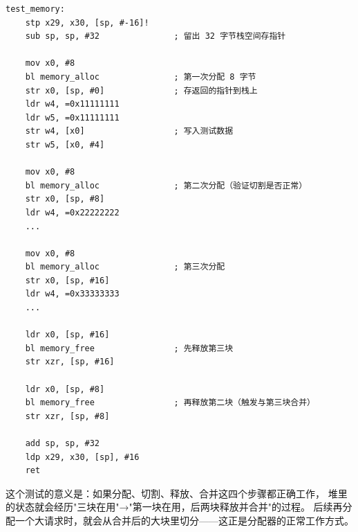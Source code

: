 \begin{lstlisting}[style=asm,caption=test.s — test\_memory]
test_memory:
    stp x29, x30, [sp, #-16]!
    sub sp, sp, #32               ; 留出 32 字节栈空间存指针

    mov x0, #8
    bl memory_alloc               ; 第一次分配 8 字节
    str x0, [sp, #0]              ; 存返回的指针到栈上
    ldr w4, =0x11111111
    ldr w5, =0x11111111
    str w4, [x0]                  ; 写入测试数据
    str w5, [x0, #4]

    mov x0, #8
    bl memory_alloc               ; 第二次分配（验证切割是否正常）
    str x0, [sp, #8]
    ldr w4, =0x22222222
    ...

    mov x0, #8
    bl memory_alloc               ; 第三次分配
    str x0, [sp, #16]
    ldr w4, =0x33333333
    ...

    ldr x0, [sp, #16]
    bl memory_free                ; 先释放第三块
    str xzr, [sp, #16]

    ldr x0, [sp, #8]
    bl memory_free                ; 再释放第二块（触发与第三块合并）
    str xzr, [sp, #8]

    add sp, sp, #32
    ldp x29, x30, [sp], #16
    ret
\end{lstlisting}

这个测试的意义是：如果分配、切割、释放、合并这四个步骤都正确工作，
堆里的状态就会经历"三块在用"→"第一块在用，后两块释放并合并"的过程。
后续再分配一个大请求时，就会从合并后的大块里切分——这正是分配器的正常工作方式。
